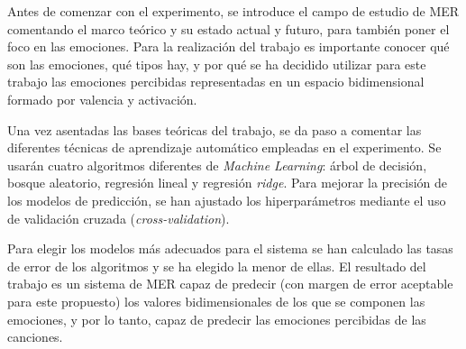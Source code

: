\documentclass[12pt,a4paper]{article}
\newcommand\blankpage{%
	\null
	\thispagestyle{empty}%
	\newpage}
\begin{document}
Antes de comenzar con el experimento, se introduce el campo de estudio de MER comentando el marco teórico y su estado actual y futuro, para también poner el foco en las emociones. Para la realización del trabajo es importante conocer qué son las emociones, qué tipos hay, y por qué se ha decidido utilizar para este trabajo las emociones percibidas representadas en un espacio bidimensional formado por valencia y activación.


Una vez asentadas las bases teóricas del trabajo, se da paso a comentar las diferentes técnicas de aprendizaje automático empleadas en el experimento. Se usarán cuatro algoritmos diferentes de \textit{Machine Learning}: árbol de decisión, bosque aleatorio, regresión lineal y regresión \textit{ridge}. Para mejorar la precisión de los modelos de predicción, se han ajustado los hiperparámetros mediante el uso de validación cruzada (\textit{cross-validation}). 


Para elegir los modelos más adecuados para el sistema se han calculado las tasas de error de los algoritmos y se ha elegido la menor de ellas. El resultado del trabajo es un sistema de MER capaz de predecir (con margen de error aceptable para este propuesto) los valores bidimensionales de los que se componen las emociones, y por lo tanto, capaz de predecir las emociones percibidas de las canciones.








\newpage
\renewcommand*\contentsname{Índice} %
\tableofcontents
\afterpage{\blankpage} %




\newpage
\renewcommand{\listtablename}{Índice de tablas} %
\listoftables %




\newpage
\renewcommand{\listfigurename}{Índice de figuras} %
\listoffigures %
\end{document}
